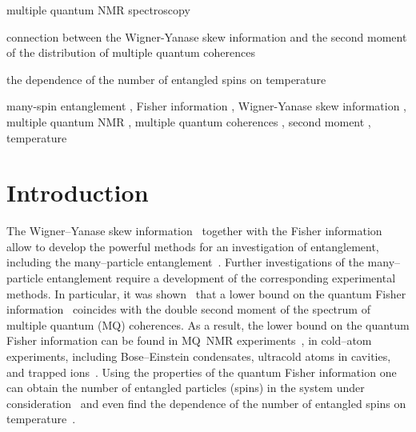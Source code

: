\documentclass[preprint,12pt]{elsarticle}
\begin{document}
\begin{frontmatter}

\begin{highlights}
	\item multiple quantum NMR spectroscopy
	\item connection between the Wigner-Yanase skew information and the second moment of the distribution of multiple quantum coherences
	\item the dependence of the number of entangled spins on temperature
\end{highlights}

\begin{keyword}
	many-spin entanglement \sep
	Fisher information \sep
	Wigner-Yanase skew information \sep
	multiple quantum NMR \sep
	multiple quantum coherences \sep
	second moment \sep
	temperature
\end{keyword}

\end{frontmatter}

\linenumbers


\section{Introduction}
\label{sec:1}
The Wigner--Yanase skew information~\cite{1,2,3,4} together with the Fisher information~\cite{5,6} allow to develop the powerful methods for an investigation of entanglement, including the many--particle entanglement~\cite{7,8}.
Further investigations of the many--particle entanglement require a development of the corresponding experimental methods.
In particular, it was shown~\cite{7,9} that a lower bound on the quantum Fisher information~\cite{5,6} coincides with the double second moment of the spectrum of multiple quantum (MQ) coherences.
As a result, the lower bound on the quantum Fisher information can be found in MQ~NMR experiments~\cite{10},
in cold--atom experiments, including Bose--Einstein condensates, ultracold atoms in cavities, and trapped ions~\cite{11,12,13,14,15}.
Using the properties of the quantum Fisher information one can obtain the number of entangled particles (spins) in the system under consideration~\cite{7}
and even find the dependence of the number of entangled spins on temperature~\cite{9}.
\end{document}
